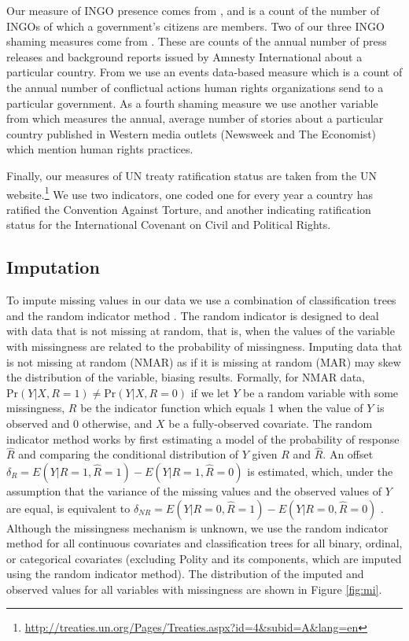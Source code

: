 \documentclass[12pt]{article}
\begin{document}
Our measure of INGO presence comes from \citet{HafnerBurtonTsutsui2005}, and is a count of the number of INGOs of which a government's citizens are members. Two of our three INGO shaming measures come from \citet{RonRamosRodgers2005}. These are counts of the annual number of press releases and background reports issued by Amnesty International about a particular country. From \citet{MurdieDavis2012} we use an events data-based measure which is a count of the annual number of conflictual actions human rights organizations send to a particular government. As a fourth shaming measure we use another variable from \citet{RonRamosRodgers2005} which measures the annual, average number of stories about a particular country published in Western media outlets (Newsweek and The Economist) which mention human rights practices. 

Finally, our measures of UN treaty ratification status are taken from the UN website.\footnote{\url{http://treaties.un.org/Pages/Treaties.aspx?id=4&subid=A&lang=en}} We use two indicators, one coded one for every year a country has ratified the Convention Against Torture, and another indicating ratification status for the International Covenant on Civil and Political Rights. 

\subsection{Imputation}

To impute missing values in our data we use a combination of classification trees and the random indicator method \citep{buuren2011mice,jolani2012}. The random indicator is designed to deal with data that is not missing at random, that is, when the values of the variable with missingness are related to the probability of missingness. Imputing data that is not missing at random (NMAR) as if it is missing at random (MAR) may skew the distribution of the variable, biasing results. Formally, for NMAR data, $\text{Pr}(Y|X, R=1) \neq \text{Pr}(Y|X, R=0)$ if we let $Y$ be a random variable with some missingness, $R$ be the indicator function which equals 1 when the value of $Y$ is observed and 0 otherwise, and $X$ be a fully-observed covariate. The random indicator method works by first estimating a model of the probability of response $\hat{R}$ and comparing the conditional distribution of $Y$ given $R$ and $\hat{R}$. An offset $\delta_R = E(Y|R=1,\hat{R}=1) - E(Y|R=1,\hat{R}=0)$ is estimated, which, under the assumption that the variance of the missing values and the observed values of $Y$ are equal, is equivalent to $\delta_{NR} = E(Y|R=0,\hat{R}=1) - E(Y|R=0,\hat{R}=0)$ \citep{jolani2012}. Although the missingness mechanism is unknown, we use the random indicator method for all continuous covariates and classification trees for all binary, ordinal, or categorical covariates (excluding Polity and its components, which are imputed using the random indicator method). The distribution of the imputed and observed values for all variables with missingness are shown in Figure \ref{fig:mi}.
\end{document}
